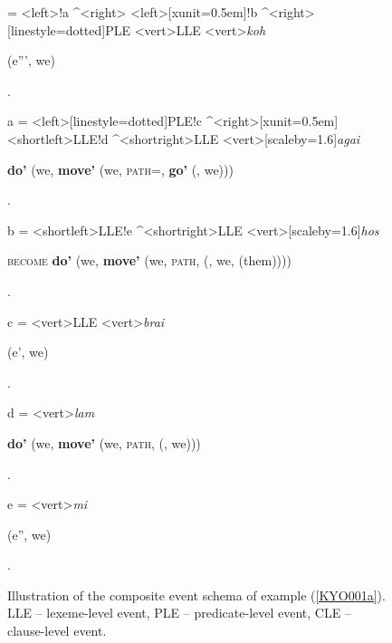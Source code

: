 \begin{sidewaysfigure}
\! = {\stuff[a]}
<left>{\stuff[b]}!a ^<right>{\stuff[c]}
<left>[xunit=0.5em]{\stuff[d]}!b ^<right>[linestyle=dotted]{PLE}
<vert>{LLE}
<vert>{\textit{koh}}
{\begin{scriptsize} \textsc{} (e''', we)\end{scriptsize}}.

\!a = <left>[linestyle=dotted]{PLE}!c ^<right>[xunit=0.5em]{\stuff[e]}
<shortleft>{LLE}!d ^<shortright>{LLE}
<vert>[scaleby=1.6]{\textit{agai}}
{\begin{scriptsize} \textbf{do'} (we, \textbf{move'} (we, \textsc{path=}, \textbf{go'} (, we)))\end{scriptsize}}.

\!b = <shortleft>{LLE}!e ^<shortright>{LLE}
<vert>[scaleby=1.6]{\textit{hos}}
{\begin{scriptsize} \textsc{become} \textbf{do'} (we, \textbf{move'} (we, \textsc{path}, \textbf{} (, we, (them))))\end{scriptsize}}.

\!c = <vert>{LLE}
<vert>{\textit{brai}}
{\begin{scriptsize} \textsc{} (e', we)\end{scriptsize}}.

\!d = <vert>{\textit{lam}}
{\begin{scriptsize} \textbf{do'} (we, \textbf{move'} (we, \textsc{path}, \textbf{} (, we)))\end{scriptsize}}.

\!e = <vert>{\textit{mi}}
{\begin{scriptsize} \textsc{} (e'', we)\end{scriptsize}}.

\endjtree


\caption[Event schema illustration of example (\ref{KYO001a})]{Illustration of the composite event schema of example (\ref{KYO001a}). LLE -- lexeme-level event, PLE -- predicate-level event, CLE -- clause-level event.}
\label{figure:eventschema_KYO001a}
\end{sidewaysfigure}


